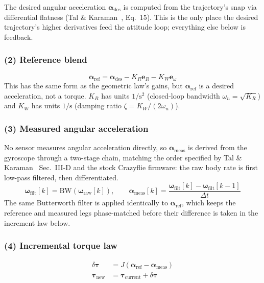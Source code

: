\documentclass[11pt,a4paper]{article}
\begin{document}
The desired angular acceleration $\boldsymbol{\alpha}_{\mathrm{des}}$ is computed from the
trajectory's snap via differential flatness (Tal \& Karaman~\cite{tal2020}, Eq.~15). This is the
only place the desired trajectory's higher derivatives feed the attitude loop; everything else
below is feedback.

\subsubsection{(2) Reference blend}

\[
  \boldsymbol{\alpha}_{\mathrm{ref}} = \boldsymbol{\alpha}_{\mathrm{des}}
    - K_R \mathbf{e}_R - K_W \mathbf{e}_\omega
\]
This has the same form as the geometric law's gains, but $\boldsymbol{\alpha}_{\mathrm{ref}}$ is a
desired acceleration, not a torque. $K_R$ has units $1/\mathrm{s}^2$ (closed-loop bandwidth
$\omega_n=\sqrt{K_R}$) and $K_W$ has units $1/\mathrm{s}$ (damping ratio $\zeta=K_W/(2\omega_n)$).

\subsubsection{(3) Measured angular acceleration}

No sensor measures angular acceleration directly, so $\boldsymbol{\alpha}_{\mathrm{meas}}$ is
derived from the gyroscope through a two-stage chain, matching the order specified by Tal \&
Karaman~\cite{tal2020} Sec.~III-D and the stock Crazyflie firmware: the raw body rate is first
low-pass filtered, then differentiated.
\[
  \boldsymbol{\omega}_{\mathrm{filt}}[k] = \mathrm{BW}(\boldsymbol{\omega}_{\mathrm{raw}}[k]),
  \qquad
  \boldsymbol{\alpha}_{\mathrm{meas}}[k] =
    \frac{\boldsymbol{\omega}_{\mathrm{filt}}[k]-\boldsymbol{\omega}_{\mathrm{filt}}[k-1]}{\Delta t}
\]
The same Butterworth filter is applied identically to $\boldsymbol{\alpha}_{\mathrm{ref}}$, which
keeps the reference and measured legs phase-matched before their difference is taken in the
increment law below.

\subsubsection{(4) Incremental torque law}

\begin{align}
  \delta\boldsymbol{\tau} &= J\left(\boldsymbol{\alpha}_{\mathrm{ref}} - \boldsymbol{\alpha}_{\mathrm{meas}}\right) \\
  \boldsymbol{\tau}_{\mathrm{new}} &= \boldsymbol{\tau}_{\mathrm{current}} + \delta\boldsymbol{\tau}
\end{align}
\end{document}
